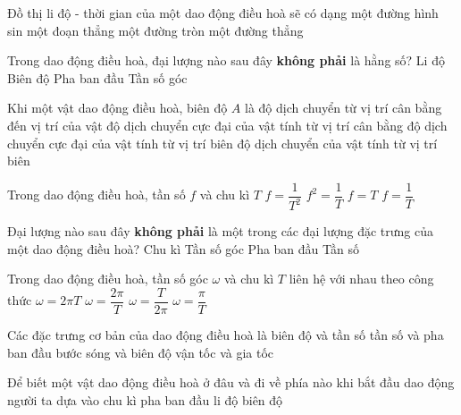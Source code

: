 \begin{ex}
	Đồ thị li độ - thời gian của một dao động điều hoà sẽ có dạng
	\choice
	{\True một đường hình sin}
	{một đoạn thẳng}
	{một đường tròn}
	{một đường thẳng}
	\loigiai{}
\end{ex}
\begin{ex}
Trong dao động điều hoà, đại lượng nào sau đây \textbf{không phải} là hằng số?	
	\choice
	{\True Li độ}
	{Biên độ}
	{Pha ban đầu}
	{Tần số góc}
	\loigiai{}
\end{ex}
\begin{ex}
Khi một vật dao động điều hoà, biên độ $A$ là	
	\choice
	{độ dịch chuyển từ vị trí cân bằng đến vị trí của vật}
	{\True độ dịch chuyển cực đại của vật tính từ vị trí cân bằng}
	{độ dịch chuyển cực đại của vật tính từ vị trí biên}
	{độ dịch chuyển của vật tính từ vị trí biên}
	\loigiai{}
\end{ex}
\begin{ex}
Trong dao động điều hoà, tần số $f$ và chu kì $T$	
	\choice
	{$f=\dfrac{1}{T^2}$}
	{$f^2=\dfrac{1}{T}$}
	{$f=T$}
	{\True $f=\dfrac{1}{T}$}
	\loigiai{}
\end{ex}
\begin{ex}
	Đại lượng nào sau đây \textbf{không phải} là một trong các đại lượng đặc trưng của một dao động điều hoà?
	\choice
	{Chu kì}
	{Tần số góc}
	{\True Pha ban đầu}
	{Tần số}
	\loigiai{}
\end{ex}
\begin{ex}
	Trong dao động điều hoà, tần số góc $\omega$ và chu kì $T$ liên hệ với nhau theo công thức 
	\choice
	{$\omega =2\pi T$}
	{\True $\omega=\dfrac{2\pi}{T}$}
	{$\omega=\dfrac{T}{2\pi}$}
	{$\omega=\dfrac{\pi}{T}$}
	\loigiai{}
\end{ex}
\begin{ex}
Các đặc trưng cơ bản của dao động điều hoà là	
	\choice
	{\True biên độ và tần số}
	{tần số và pha ban đầu}
	{bước sóng và biên độ}
	{vận tốc và gia tốc}
	\loigiai{}
\end{ex}
\begin{ex}
Để biết một vật dao động điều hoà ở đâu và đi về phía nào khi bắt đầu dao động người ta dựa vào	
	\choice
	{chu kì}
	{\True pha ban đầu}
	{li độ}
	{biên độ}
	\loigiai{}
\end{ex}
